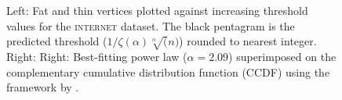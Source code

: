 \begin{figure}[!ht]
\centering
{}%
%
\caption{Left: Fat and thin vertices plotted against increasing threshold values for the \textsc{internet} dataset. The black pentagram is the predicted threshold ($1/\zeta(\alpha)\sqrt[\alpha](n)$) rounded to nearest integer. Right: Right: Best-fitting power law ($\alpha = 2.09$) superimposed on the complementary cumulative distribution function (CCDF) using the framework by \cite{clauset2009power}.} %
\label{fig:internet}%
\end{figure}

